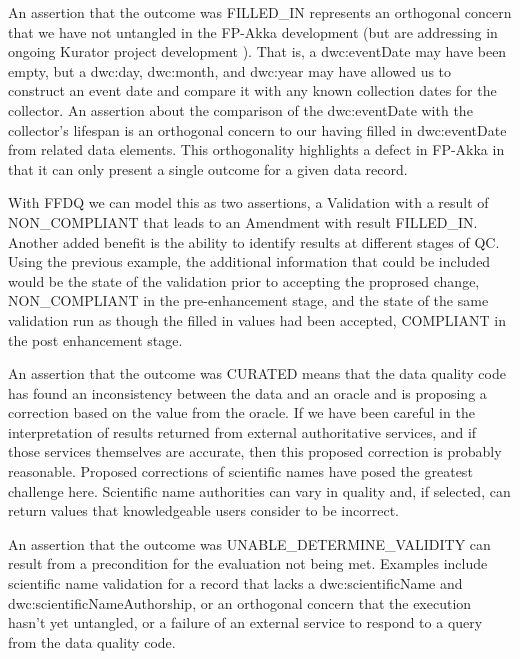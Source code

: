 \documentclass{article}
\begin{document}
An assertion that the outcome was FILLED\_IN represents an orthogonal concern that we have not untangled in the FP-Akka development (but are addressing in ongoing Kurator project development \citep{Kurator_wiki_2016}).  That is, a dwc:eventDate may have been empty, but a dwc:day, dwc:month, and dwc:year may have allowed us to construct an event date and compare it with any known collection dates for the collector.  An assertion about the comparison of the dwc:eventDate with the collector's lifespan is an orthogonal concern to our having filled in dwc:eventDate from related data elements.  This orthogonality highlights a defect in FP-Akka in that it can only present a single outcome for a given data record. 

With FFDQ we can model this as two assertions, a Validation with a result of NON\_COMPLIANT that leads to an Amendment with result FILLED\_IN. Another added benefit is the ability to identify results at different stages of QC. Using the previous example, the additional information that could be included would be the state of the validation prior to accepting the proprosed change, NON\_COMPLIANT in the pre-enhancement stage, and the state of the same validation run as though the filled in values had been accepted, COMPLIANT in the post enhancement stage.

An assertion that the outcome was CURATED means that the data quality code has found an inconsistency between the data and an oracle and is proposing a correction based on the value from the oracle.  If we have been careful in the interpretation of results returned from external authoritative services, and if those services themselves are accurate, then this proposed correction is probably reasonable.  Proposed corrections of scientific names have posed the greatest challenge here.  Scientific name authorities can vary in quality and, if selected, can return values that knowledgeable users consider to be incorrect. 

An assertion that the outcome was UNABLE\_DETERMINE\_VALIDITY can result from a precondition for the evaluation not being met. 
Examples include scientific name validation for a record that lacks a dwc:scientificName and dwc:scientificNameAuthorship, or an orthogonal concern that the execution hasn't yet untangled, or a failure of an external service to respond to a query from the data quality code.
\end{document}
